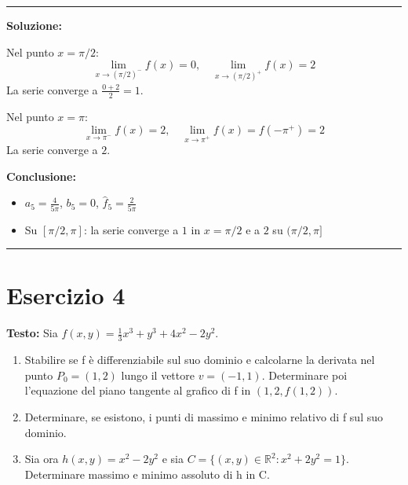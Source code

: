 \documentclass[12pt, a4paper]{article}
\newenvironment{solution}
{\par\noindent\rule{\textwidth}{0.4pt}\par\textbf{Soluzione:}\medskip\par}
{\par\rule{\textwidth}{0.4pt}\par\bigskip}
\begin{document}
\begin{solution}
Nel punto $x = \pi/2$:
\[
\lim_{x \to (\pi/2)^-} f(x) = 0, \quad \lim_{x \to (\pi/2)^+} f(x) = 2
\]
La serie converge a $\frac{0+2}{2} = 1$.

Nel punto $x = \pi$:
\[
\lim_{x \to \pi^-} f(x) = 2, \quad \lim_{x \to \pi^+} f(x) = f(-\pi^+) = 2
\]
La serie converge a $2$.

\textbf{Conclusione:}
\begin{itemize}
    \item $a_5 = \frac{4}{5\pi}$, $b_5 = 0$, $\hat{f}_5 = \frac{2}{5\pi}$
    \item Su $[\pi/2, \pi]$: la serie converge a $1$ in $x = \pi/2$ e a $2$ su $(\pi/2, \pi]$
\end{itemize}
\end{solution}

\newpage

\section*{Esercizio 4}

\textbf{Testo:} Sia $f(x,y) = \frac{1}{3}x^{3} + y^{3} + 4x^{2} - 2y^{2}$.
\begin{enumerate}
    \item Stabilire se f è differenziabile sul suo dominio e calcolarne la derivata nel punto $P_{0}=(1,2)$ lungo il vettore $v=(-1,1)$. Determinare poi l'equazione del piano tangente al grafico di f in $(1,2,f(1,2))$.
    \item Determinare, se esistono, i punti di massimo e minimo relativo di f sul suo dominio.
    \item Sia ora $h(x,y) = x^{2}-2y^{2}$ e sia $C = \{(x,y) \in \mathbb{R}^{2} : x^{2}+2y^{2}=1\}$. Determinare massimo e minimo assoluto di h in C.
\end{enumerate}
\end{document}
